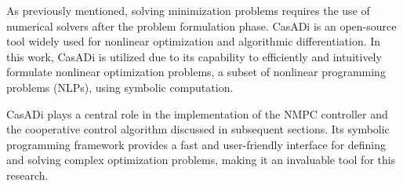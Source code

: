 As previously mentioned, solving minimization problems requires the use of numerical solvers after the problem formulation phase. CasADi \cite{Andersson2019} is an open-source tool widely used for nonlinear optimization and algorithmic differentiation. In this work, CasADi is utilized due to its capability to efficiently and intuitively formulate nonlinear optimization problems, a subset of nonlinear programming problems (NLPs), using symbolic computation.

CasADi plays a central role in the implementation of the NMPC controller and the cooperative control algorithm discussed in subsequent sections. Its symbolic programming framework provides a fast and user-friendly interface for defining and solving complex optimization problems, making it an invaluable tool for this research.
